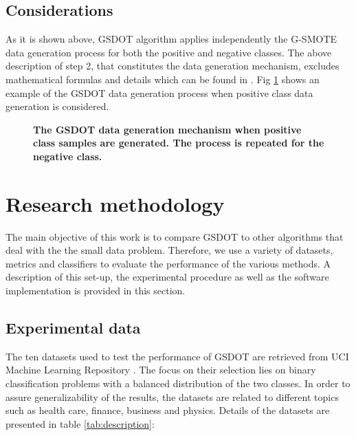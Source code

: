\documentclass[10pt,letterpaper]{article}
\begin{document}
\subsection{Considerations}

As it is shown above, GSDOT algorithm applies independently the G-SMOTE data generation process for both the positive and negative classes. The above description of step 2, that constitutes the data generation mechanism,  excludes mathematical formulas and details which can be found in \cite{Douzas.2019}. Fig \ref{fig:gsmotemechanism} shows an example of the GSDOT data generation process when positive class data generation is considered.

\begin{figure}[!h]
	\centering
	\caption{\bf The GSDOT data generation mechanism when positive class samples are generated. The process is repeated for the negative class.}
	\label{fig:gsmotemechanism}
\end{figure}

\section{Research methodology}
\label{research}

The main objective of this work is to compare GSDOT to other algorithms that deal with the the small data problem. Therefore, we use a variety of datasets, metrics and classifiers to evaluate the performance of the various methods. A description of this set-up, the experimental procedure as well as the software implementation is provided in this section.

\subsection{Experimental data}

The ten datasets used to test the performance of GSDOT are retrieved from UCI Machine Learning Repository \cite{Dua.2019}. The focus on their selection lies on binary classification problems with a balanced distribution of the two classes. In order to assure generalizability of the results, the datasets are related to different topics such as health care, finance, business and physics. Details of the datasets are presented in table \ref{tab:description}:
\end{document}
